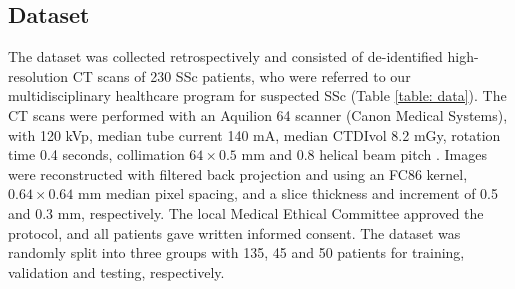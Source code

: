 \subsection{Dataset}
The dataset was collected retrospectively and consisted of de-identified high-resolution CT scans of 230 SSc patients, who were referred to our multidisciplinary healthcare program \cite{Meijs2016} for suspected SSc (Table \ref{table: data}). The CT scans were performed with an Aquilion 64 scanner (Canon Medical Systems), with 120 kVp, median tube current 140 mA, median CTDIvol 8.2 mGy, rotation time 0.4 seconds, collimation $64 \times 0.5$ mm and 0.8 helical beam pitch \cite{Ninaber2015a}. Images were reconstructed with filtered back projection and using an FC86 kernel, $0.64 \times 0.64$ mm median pixel spacing, and a slice thickness and increment of 0.5 and 0.3 mm, respectively. The local Medical Ethical Committee approved the protocol, and all patients gave written informed consent. The dataset was randomly split into three groups with 135, 45 and 50 patients for training, validation and testing, respectively.


